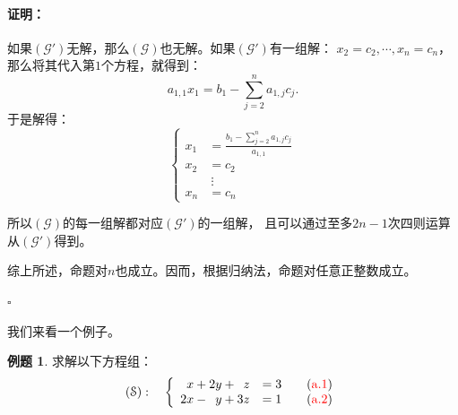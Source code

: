 \documentclass[12pt,UTF8]{ctexbook}
\theoremstyle{definition}
\newtheorem{et}{例题}[section]
\theoremstyle{plain}
\renewenvironment{proof}{\paragraph{\textbf{证明：}}}{\hfill$\square$}
\begin{document}
\begin{proof}
    如果$(\mathcal{G}')$无解，那么$(\mathcal{G})$也无解。如果$(\mathcal{G}')$有一组解：
    $x_2 = c_2, \cdots , x_n = c_n$，那么将其代入第$1$个方程，就得到：
    $$ a_{1,1} x_1 = b_{1} - \sum_{j=2}^n a_{1,j} c_j. $$
    于是解得：
    $$ \left\{
        \begin{array}{rl}
        x_1 &= \displaystyle \frac{b_{1} - \sum_{j=2}^n a_{1,j} c_j}{a_{1,1}} \\
        x_2 &= c_2  \\
        \quad & \:\vdots   \\
        x_n &= c_n 
        \end{array}
    \right.$$

    所以$(\mathcal{G})$的每一组解都对应$(\mathcal{G}')$的一组解，
    且可以通过至多$2n-1$次四则运算从$(\mathcal{G}')$得到。

    综上所述，命题对$n$也成立。因而，根据归纳法，命题对任意正整数成立。

\end{proof}

我们来看一个例子。

\begin{et}
    求解以下方程组：
    $$ (\mathcal{S}):\quad \left\{
        \begin{array}{rl}
    x + 2y + \phantom{0}z &= 3 \quad \quad ({\color{red}\mathrm{a}.1})\\
    2x - \phantom{0}y + 3z &= 1  \quad \quad ({\color{red}\mathrm{a}.2})
    \end{array}
    \right. $$    
\end{et}
\end{document}
